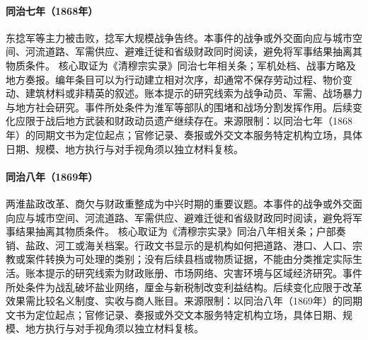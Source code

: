 \hypertarget{civic:EQ-1868-NIAN-SUPPRESSION}{}\paragraph{同治七年（1868年）}东捻军等主力被击败，捻军大规模战争告终。本事件的战争或外交面向应与城市空间、河流道路、军需供应、避难迁徙和省级财政同时阅读，避免将军事结果抽离其物质条件。 核心取证为《清穆宗实录》同治七年相关条；军机处档、战事方略及地方奏报。编年条目可以为行动建立相对次序，却通常不保存劳动过程、物价变动、建筑材料或非精英的叙述。账本提示的研究线索为战争动员、军需、战场暴力与地方社会研究。事件所处条件为淮军等部队的围堵和战场分割发挥作用。后续变化应限于战后地方武装和财政动员遗产继续存在。来源限制：以同治七年（1868年）的同期文书为定位起点；官修记录、奏报或外交文本服务特定机构立场，具体日期、规模、地方执行与对手视角须以独立材料复核。
\hypertarget{civic:EQ-1869-YANGZHOU-SALT-CRISIS}{}\paragraph{同治八年（1869年）}两淮盐政改革、商欠与财政重整成为中兴时期的重要议题。本事件的战争或外交面向应与城市空间、河流道路、军需供应、避难迁徙和省级财政同时阅读，避免将军事结果抽离其物质条件。 核心取证为《清穆宗实录》同治八年相关条；户部奏销、盐政、河工或海关档案。行政文书显示的是机构如何把道路、港口、人口、宗教或案件转换为可处理的类别；没有后续县档或物质证据，不能由分类推定实际生活。账本提示的研究线索为财政账册、市场网络、灾害环境与区域经济研究。事件所处条件为战乱破坏盐业网络，厘金与新税制改变利益结构。后续变化应限于改革效果需比较名义制度、实收与商人账目。来源限制：以同治八年（1869年）的同期文书为定位起点；官修记录、奏报或外交文本服务特定机构立场，具体日期、规模、地方执行与对手视角须以独立材料复核。
